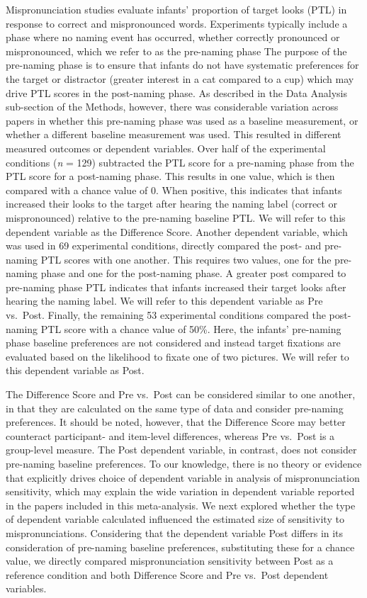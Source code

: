 \documentclass[man]{apa6}
\theoremstyle{definition}
\theoremstyle{definition}
\theoremstyle{definition}
\theoremstyle{remark}
\begin{document}
Mispronunciation studies evaluate infants' proportion of target looks
(PTL) in response to correct and mispronounced words. Experiments
typically include a phase where no naming event has occurred, whether
correctly pronounced or mispronounced, which we refer to as the
pre-naming phase The purpose of the pre-naming phase is to ensure that
infants do not have systematic preferences for the target or distractor
(greater interest in a cat compared to a cup) which may drive PTL scores
in the post-naming phase. As described in the Data Analysis sub-section
of the Methods, however, there was considerable variation across papers
in whether this pre-naming phase was used as a baseline measurement, or
whether a different baseline measurement was used. This resulted in
different measured outcomes or dependent variables. Over half of the
experimental conditions (\emph{n} = 129) subtracted the PTL score for a
pre-naming phase from the PTL score for a post-naming phase. This
results in one value, which is then compared with a chance value of 0.
When positive, this indicates that infants increased their looks to the
target after hearing the naming label (correct or mispronounced)
relative to the pre-naming baseline PTL. We will refer to this dependent
variable as the Difference Score. Another dependent variable, which was
used in 69 experimental conditions, directly compared the post- and
pre-naming PTL scores with one another. This requires two values, one
for the pre-naming phase and one for the post-naming phase. A greater
post compared to pre-naming phase PTL indicates that infants increased
their target looks after hearing the naming label. We will refer to this
dependent variable as Pre vs.~Post. Finally, the remaining 53
experimental conditions compared the post-naming PTL score with a chance
value of 50\%. Here, the infants' pre-naming phase baseline preferences
are not considered and instead target fixations are evaluated based on
the likelihood to fixate one of two pictures. We will refer to this
dependent variable as Post.

The Difference Score and Pre vs.~Post can be considered similar to one
another, in that they are calculated on the same type of data and
consider pre-naming preferences. It should be noted, however, that the
Difference Score may better counteract participant- and item-level
differences, whereas Pre vs.~Post is a group-level measure. The Post
dependent variable, in contrast, does not consider pre-naming baseline
preferences. To our knowledge, there is no theory or evidence that
explicitly drives choice of dependent variable in analysis of
mispronunciation sensitivity, which may explain the wide variation in
dependent variable reported in the papers included in this
meta-analysis. We next explored whether the type of dependent variable
calculated influenced the estimated size of sensitivity to
mispronunciations. Considering that the dependent variable Post differs
in its consideration of pre-naming baseline preferences, substituting
these for a chance value, we directly compared mispronunciation
sensitivity between Post as a reference condition and both Difference
Score and Pre vs.~Post dependent variables.
\end{document}
